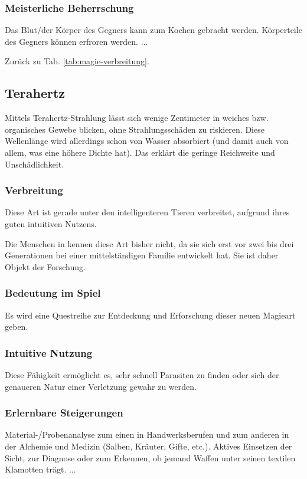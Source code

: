 \subsubsection{Meisterliche Beherrschung} 
\begin{outline}
	\1 Das Blut/der Körper des Gegners kann zum Kochen gebracht werden.
	\1 Körperteile des Gegners können erfroren werden.
	\1 ...
\end{outline}
Zurück zu Tab. \ref{tab:magie-verbreitung}.



\subsection{Terahertz}\label{magie:terahertz}
Mittels Terahertz-Strahlung lässt sich wenige Zentimeter in weiches bzw. organisches Gewebe blicken, ohne Strahlungsschäden zu riskieren.
Diese Wellenlänge wird allerdings schon von Wasser absorbiert (und damit auch von allem, was eine höhere Dichte hat).
Das erklärt die geringe Reichweite und Unschädlichkeit.

\subsubsection{Verbreitung}
Diese Art ist gerade unter den intelligenteren Tieren verbreitet, aufgrund ihres guten intuitiven Nutzens.

Die Menschen in  kennen diese Art bisher nicht, da sie sich erst vor zwei bis drei Generationen bei einer mittelständigen Familie entwickelt hat.
Sie ist daher Objekt der Forschung.

\subsubsection{Bedeutung im Spiel}
Es wird eine Questreihe zur Entdeckung und Erforschung dieser neuen Magieart geben.

\subsubsection{Intuitive Nutzung}
Diese Fähigkeit ermöglicht es, sehr schnell Parasiten zu finden oder sich der genaueren Natur einer Verletzung gewahr zu werden.

\subsubsection{Erlernbare Steigerungen}
\begin{outline}
	\1 Material-/Probenanalyse zum einen in Handwerksberufen und zum anderen in der Alchemie und Medizin (\zB Salben, Kräuter, Gifte, etc.).
	\1 Aktives Einsetzen der Sicht, \zB zur Diagnose oder zum Erkennen, ob jemand Waffen unter seinen textilen Klamotten trägt.
	\1 ...
\end{outline}

